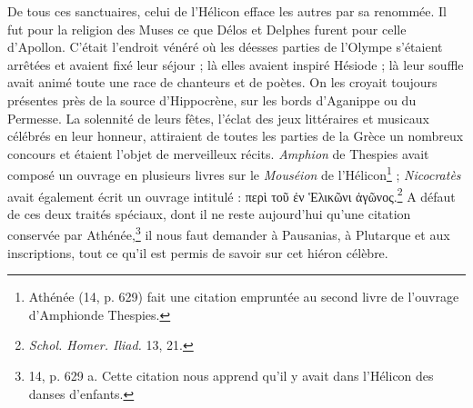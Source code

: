 \documentclass[a4paper, 11pt, oneside, polutonikogreek, french]{article}
\begin{document}
De tous ces sanctuaires, celui de l'Hélicon efface les autres par sa renommée. Il fut pour la religion des Muses ce que Délos et Delphes furent pour celle d'Apollon. C'était l'endroit vénéré où les déesses parties de l'Olympe s'étaient arrêtées et avaient fixé leur séjour ; là elles avaient inspiré Hésiode ; là leur souffle avait animé toute une race de chanteurs et de poètes. On les croyait toujours présentes près de la source d'Hippocrène, sur les bords d'Aganippe ou du Permesse. La solennité de leurs fêtes, l'éclat des jeux littéraires et musicaux célébrés en leur honneur, attiraient de toutes les parties de la Grèce un nombreux concours et étaient l'objet de merveilleux récits. \emph{Amphion} de Thespies avait composé un ouvrage en plusieurs livres sur le \emph{Mouséion} de l'Hélicon\footnote{Athénée (14, p. 629) fait une citation empruntée au second livre de l'ouvrage d'Amphionde Thespies.} ; \emph{Nicocratès} avait également écrit un ouvrage intitulé : περὶ τοῦ ἐν Ἑλικῶνι ἀγῶνος.\footnote{\emph{Schol. Homer. Iliad.} 13, 21.} A défaut de ces deux traités spéciaux, dont il ne reste aujourd'hui qu'une citation conservée par Athénée,\footnote{14, p. 629 a. Cette citation nous apprend qu'il y avait dans l'Hélicon des danses d'enfants.} il nous faut demander à Pausanias, à Plutarque et aux inscriptions, tout ce qu'il est permis de savoir sur cet hiéron célèbre.
\end{document}
